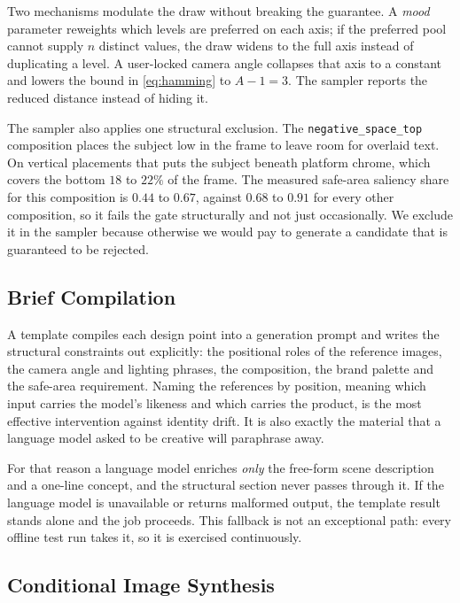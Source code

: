 \documentclass[conference]{IEEEtran}
\begin{document}
Two mechanisms modulate the draw without breaking the guarantee. A \emph{mood}
parameter reweights which levels are preferred on each axis; if the preferred pool
cannot supply $n$ distinct values, the draw widens to the full axis instead of
duplicating a level. A user-locked camera angle collapses that axis to a constant
and lowers the bound in \eqref{eq:hamming} to $A-1=3$. The sampler reports the
reduced distance instead of hiding it.

The sampler also applies one structural exclusion. The \texttt{negative\_space\_top}
composition places the subject low in the frame to leave room for overlaid text. On
vertical placements that puts the subject beneath platform chrome, which covers the
bottom $18$ to $22\%$ of the frame. The measured safe-area saliency share for this
composition is $0.44$ to $0.67$, against $0.68$ to $0.91$ for every other
composition, so it fails the gate structurally and not just occasionally. We exclude
it in the sampler because otherwise we would pay to generate a candidate that is
guaranteed to be rejected.

\subsection{Brief Compilation}

A template compiles each design point into a generation prompt and writes the
structural constraints out explicitly: the positional roles of the reference images,
the camera angle and lighting phrases, the composition, the brand palette and the
safe-area requirement. Naming the references by position, meaning which input
carries the model's likeness and which carries the product, is the most effective
intervention against identity drift. It is also exactly the material that a language
model asked to be creative will paraphrase away.

For that reason a language model enriches \emph{only} the free-form scene
description and a one-line concept, and the structural section never passes through
it. If the language model is unavailable or returns malformed output, the template
result stands alone and the job proceeds. This fallback is not an exceptional path:
every offline test run takes it, so it is exercised continuously.

\subsection{Conditional Image Synthesis}
\end{document}
